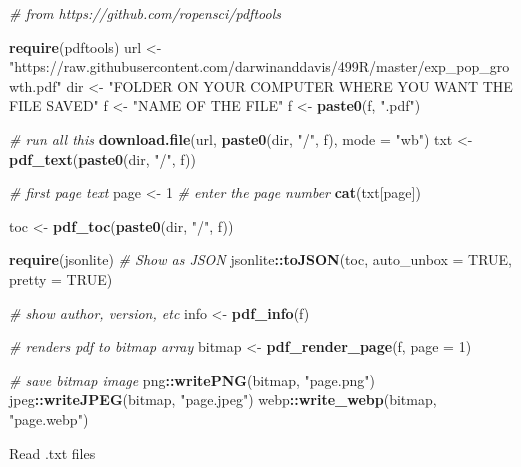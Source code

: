 \documentclass[10,portrait]{article}
\newenvironment{Shaded}{\begin{snugshade}}{\end{snugshade}}
\newcommand{\KeywordTok}[1]{\textcolor[rgb]{0.13,0.29,0.53}{\textbf{#1}}}
\newcommand{\DataTypeTok}[1]{\textcolor[rgb]{0.13,0.29,0.53}{#1}}
\newcommand{\DecValTok}[1]{\textcolor[rgb]{0.00,0.00,0.81}{#1}}
\newcommand{\StringTok}[1]{\textcolor[rgb]{0.31,0.60,0.02}{#1}}
\newcommand{\CommentTok}[1]{\textcolor[rgb]{0.56,0.35,0.01}{\textit{#1}}}
\newcommand{\OtherTok}[1]{\textcolor[rgb]{0.56,0.35,0.01}{#1}}
\newcommand{\OperatorTok}[1]{\textcolor[rgb]{0.81,0.36,0.00}{\textbf{#1}}}
\newcommand{\NormalTok}[1]{#1}
\begin{document}
\begin{Shaded}
\begin{Highlighting}[]
\CommentTok{# from https://github.com/ropensci/pdftools}

\KeywordTok{require}\NormalTok{(pdftools)}
\NormalTok{url <-}\StringTok{ "https://raw.githubusercontent.com/darwinanddavis/499R/master/exp_pop_growth.pdf"}
\NormalTok{dir <-}\StringTok{ "FOLDER ON YOUR COMPUTER WHERE YOU WANT THE FILE SAVED"}
\NormalTok{f <-}\StringTok{ "NAME OF THE FILE"}
\NormalTok{f <-}\StringTok{ }\KeywordTok{paste0}\NormalTok{(f, }\StringTok{".pdf"}\NormalTok{)}

\CommentTok{# run all this}
\KeywordTok{download.file}\NormalTok{(url, }\KeywordTok{paste0}\NormalTok{(dir, }\StringTok{"/"}\NormalTok{, f), }\DataTypeTok{mode =} \StringTok{"wb"}\NormalTok{)}
\NormalTok{txt <-}\StringTok{ }\KeywordTok{pdf_text}\NormalTok{(}\KeywordTok{paste0}\NormalTok{(dir, }\StringTok{"/"}\NormalTok{, f))}

\CommentTok{# first page text}
\NormalTok{page <-}\StringTok{ }\DecValTok{1}  \CommentTok{# enter the page number}
\KeywordTok{cat}\NormalTok{(txt[page])}

\NormalTok{toc <-}\StringTok{ }\KeywordTok{pdf_toc}\NormalTok{(}\KeywordTok{paste0}\NormalTok{(dir, }\StringTok{"/"}\NormalTok{, f))}

\KeywordTok{require}\NormalTok{(jsonlite)}
\CommentTok{# Show as JSON}
\NormalTok{jsonlite}\OperatorTok{::}\KeywordTok{toJSON}\NormalTok{(toc, }\DataTypeTok{auto_unbox =} \OtherTok{TRUE}\NormalTok{, }\DataTypeTok{pretty =} \OtherTok{TRUE}\NormalTok{)}

\CommentTok{# show author, version, etc}
\NormalTok{info <-}\StringTok{ }\KeywordTok{pdf_info}\NormalTok{(f)}

\CommentTok{# renders pdf to bitmap array}
\NormalTok{bitmap <-}\StringTok{ }\KeywordTok{pdf_render_page}\NormalTok{(f, }\DataTypeTok{page =} \DecValTok{1}\NormalTok{)}

\CommentTok{# save bitmap image}
\NormalTok{png}\OperatorTok{::}\KeywordTok{writePNG}\NormalTok{(bitmap, }\StringTok{"page.png"}\NormalTok{)}
\NormalTok{jpeg}\OperatorTok{::}\KeywordTok{writeJPEG}\NormalTok{(bitmap, }\StringTok{"page.jpeg"}\NormalTok{)}
\NormalTok{webp}\OperatorTok{::}\KeywordTok{write_webp}\NormalTok{(bitmap, }\StringTok{"page.webp"}\NormalTok{)}
\end{Highlighting}
\end{Shaded}

Read .txt files
\end{document}
